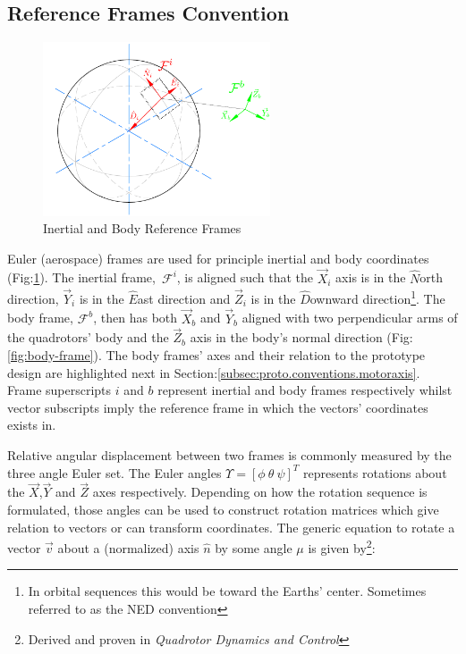 \subsection{Reference Frames Convention}
\label{subsec:proto.conventions.frames}
\begin{figure}[htbp]
\centering
\includegraphics[width=0.6\textwidth]{figs/reference_frame}
\caption{Inertial and Body Reference Frames}
\label{fig:ref_frame}
\end{figure}
Euler (aerospace) frames are used for principle inertial and body coordinates (Fig:\ref{fig:ref_frame}). The inertial frame,~$\mathcal{F}^i$, is aligned such that the $\vec{X}_i$ axis is in the $\hat{N}$orth direction, $\vec{Y}_i$ is in the $\hat{E}$ast direction and $\vec{Z}_i$ is  in the $\hat{D}$ownward direction\footnote{In orbital sequences this would be toward the Earths' center. Sometimes referred to as the NED convention}. The body frame, $\mathcal{F}^b$, then has both $\vec{X}_b$ and $\vec{Y}_b$ aligned with two perpendicular arms of the quadrotors' body and the $\vec{Z}_b$ axis in the body's normal direction (Fig:\ref{fig:body-frame}). The body frames' axes and their relation to the prototype design are highlighted next in Section:\ref{subsec:proto.conventions.motoraxis}. Frame superscripts $i$ and $b$ represent inertial and body frames respectively whilst vector subscripts imply the reference frame in which the vectors' coordinates exists in.
\par
Relative angular displacement between two frames is commonly measured by the three angle Euler set. The Euler angles $\Upsilon=[\phi ~\theta ~\psi]^T$ represents rotations about the $\vec{X}$,$\vec{Y}$ and $\vec{Z}$ axes respectively. Depending on how the rotation sequence is formulated, those angles can be used to construct rotation matrices which give relation to vectors or can transform coordinates. The generic equation to rotate a vector $\vec{v}$ about a (normalized) axis $\hat{n}$ by some angle $\mu$ is given by\footnote{Derived and proven in \emph{Quadrotor Dynamics and Control}\cite{quaddynamics}}:
